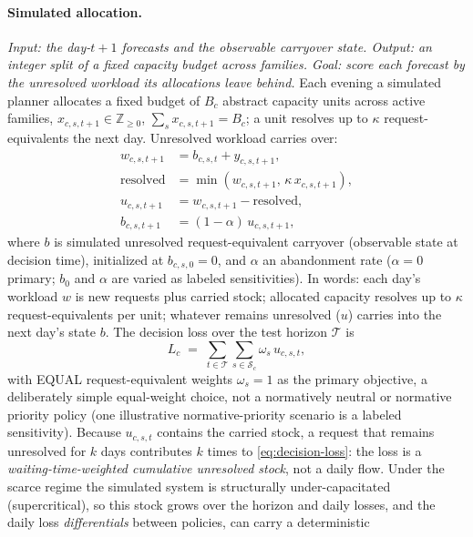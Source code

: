 \paragraph{Simulated allocation.}
\emph{Input: the day-$t{+}1$ forecasts and the observable carryover
state. Output: an integer split of a fixed capacity budget across
families. Goal: score each forecast by the unresolved workload its
allocations leave behind.}
Each evening a simulated planner allocates a fixed budget of $B_c$
abstract capacity units across active families,
$x_{c,s,t+1} \in \mathbb{Z}_{\ge 0}$, $\sum_s x_{c,s,t+1} = B_c$; a unit
resolves up to $\kappa$ request-equivalents the next day. Unresolved
workload carries over:
\begin{align}
  w_{c,s,t+1} &= b_{c,s,t} + y_{c,s,t+1}, \nonumber \\
  \mathrm{resolved} &= \min(w_{c,s,t+1},\, \kappa\, x_{c,s,t+1}), \nonumber \\
  u_{c,s,t+1} &= w_{c,s,t+1} - \mathrm{resolved}, \nonumber \\
  b_{c,s,t+1} &= (1-\alpha)\, u_{c,s,t+1},
\end{align}
where $b$ is simulated unresolved request-equivalent carryover (observable
state at decision time), initialized at $b_{c,s,0}=0$, and $\alpha$ an
abandonment rate ($\alpha=0$ primary; $b_0$ and $\alpha$ are varied as
labeled sensitivities). In words: each day's workload $w$ is new requests
plus carried stock; allocated capacity resolves up to $\kappa$
request-equivalents per unit; whatever remains unresolved ($u$) carries
into the next day's state $b$. The decision loss over the test horizon
$\mathcal{T}$ is
\begin{equation}
  L_c \;=\; \sum_{t \in \mathcal{T}} \sum_{s \in \mathcal{S}_c}
  \omega_s\, u_{c,s,t},
  \label{eq:decision-loss}
\end{equation}
with EQUAL request-equivalent weights $\omega_s = 1$ as the primary
objective, a deliberately simple equal-weight choice, not a normatively
neutral or normative priority policy (one illustrative normative-priority
scenario is a labeled sensitivity).
Because $u_{c,s,t}$ contains the carried stock, a request that remains
unresolved for $k$ days contributes $k$ times to
\eqref{eq:decision-loss}: the loss is a \emph{waiting-time-weighted
cumulative unresolved stock}, not a daily flow. Under the scarce regime
the simulated system is structurally under-capacitated (supercritical),
so this stock grows over the horizon and daily losses, and the daily
loss \emph{differentials} between policies, can carry a deterministic

